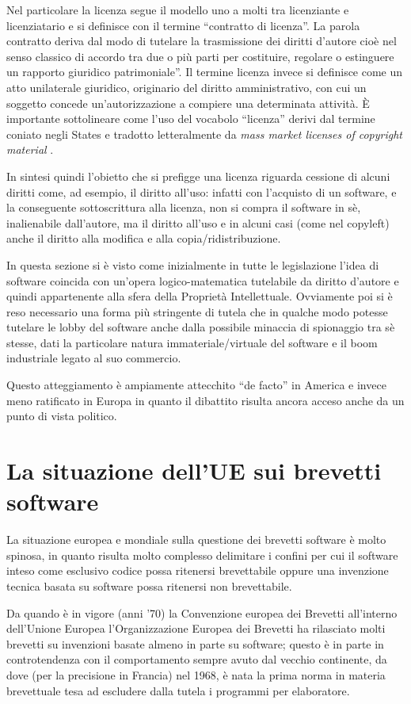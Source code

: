 Nel particolare la licenza segue il modello uno a molti tra licenziante e licenziatario e si definisce con il termine ``contratto di licenza''. La parola contratto deriva dal modo di tutelare la trasmissione dei diritti d'autore cioè nel senso classico di accordo  tra due o più parti per costituire, regolare o estinguere un rapporto giuridico patrimoniale”.
Il termine licenza invece si definisce come un atto unilaterale giuridico, originario del diritto amministrativo, con cui un soggetto concede un'autorizzazione a compiere una determinata attività. \`E importante sottolineare come l'uso del vocabolo ``licenza'' derivi dal termine coniato negli States e tradotto letteralmente da \textit{mass market licenses of copyright material }.

In sintesi quindi l'obietto che si prefigge una licenza riguarda cessione di alcuni diritti come, ad esempio, il diritto all'uso: infatti con l'acquisto di un software, e la conseguente sottoscrittura alla licenza, non si compra il software in sè, inalienabile dall'autore, ma il diritto all'uso e in alcuni casi (come nel copyleft) anche il diritto alla modifica e alla copia/ridistribuzione.

In questa sezione si è visto come inizialmente in tutte le legislazione l'idea di software coincida con un'opera logico-matematica tutelabile da diritto d'autore e quindi appartenente alla sfera della Proprietà Intellettuale. Ovviamente poi si è reso necessario una forma più stringente di tutela che in qualche modo potesse tutelare le lobby del software anche dalla possibile minaccia di spionaggio tra sè stesse, dati la particolare natura immateriale/virtuale del software e il boom industriale legato al suo commercio.

Questo atteggiamento è ampiamente attecchito ``de facto'' in America e invece meno ratificato in Europa in quanto il dibattito risulta ancora acceso anche da un punto di vista politico.

\section{La situazione dell'UE sui brevetti software}
La situazione europea e mondiale sulla questione dei brevetti software è molto spinosa, in quanto risulta molto complesso delimitare i confini per cui il software inteso come esclusivo codice possa ritenersi brevettabile oppure una invenzione tecnica basata su software possa ritenersi non brevettabile.

Da quando è in vigore (anni '70) la Convenzione europea dei Brevetti all'interno dell'Unione Europea l'Organizzazione Europea dei Brevetti ha rilasciato molti brevetti su invenzioni basate almeno in parte su software; questo è in parte in controtendenza con il comportamento sempre avuto dal vecchio continente, da dove (per la precisione in Francia) nel 1968\cite{invenzione-software}, è nata la prima norma in materia brevettuale tesa ad escludere dalla tutela i programmi per elaboratore.

